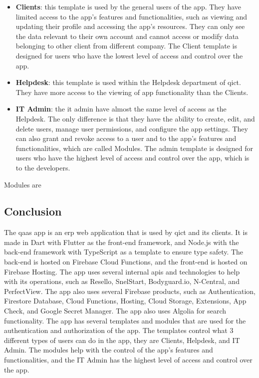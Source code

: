\begin{multicols}{2}
      \begin{itemize}
            \item \textbf{Clients}: this template is used by the general users of the app. They have limited access to
                  the app's features and functionalities, such as viewing and updating their profile and accessing the app's
                  resources. They can only see the data relevant to their own account and cannot access or modify data
                  belonging to other client from different company.  The Client template is designed for users who have the
                  lowest level of access and control over the app.
            \item \textbf{Helpdesk}: this template is used within the Helpdesk department of \acrshort{qict}. They have more
                  access to the viewing of app functionality than the Clients.
            \item \textbf{IT Admin}: the \acrshort{it} admin have almost the same level of access as the Helpdesk. The only
                  difference is that they have the ability to create, edit, and delete users, manage user permissions, and
                  configure the app settings. They can also grant and revoke access to a user and to the app's features and
                  functionalities, which are called Modules. The admin template is designed for users who have the highest level
                  of access and control over the app, which is to the developers.
      \end{itemize}

      Modules are

      \subsection{Conclusion}
      The \acrshort{qaas} app is an \acrshort{erp} web application that is used by \acrshort{qict} and its clients.
      It is made in Dart with Flutter as the front-end framework, and Node.js with the back-end  framework with
      TypeScript as a template to ensure type safety. The back-end is hosted on Firebase Cloud Functions, and the
      front-end is hosted on Firebase Hosting. The app uses several internal \acrshort{api}s and technologies to
      help with its operations, such as Resello, SnelStart, Bodyguard.io, N-Central, and PerfectView. The app also
      uses several Firebase products, such as Authentication, Firestore Database, Cloud Functions, Hosting, Cloud
      Storage, Extensions, App Check, and Google Secret Manager. The app also uses Algolia for search functionality. The app
      has several templates and modules that are used for the authentication and authorization of the app.
      The templates control what 3 different types of users can do in the app, they are Clients, Helpdesk, and IT
      Admin. The modules help with the control of the app's features and functionalities, and the IT Admin has the
      highest level of access and control over the app.


\end{multicols}
